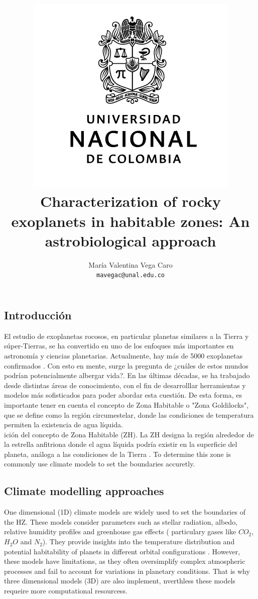 \documentclass{article}
\title{\vspace{-1.5cm}\includegraphics[scale=0.32]{Unal.jpg} \\ \vspace{-0.3cm} \textbf{Characterization of rocky exoplanets in habitable zones: An astrobiological approach}} %
\author{
    María Valentina Vega Caro\\
    
    \texttt{\textup{mavegac@unal.edu.co}}
    }
\affil{
    \textbf{Trabajo de Grado} \\
    \textbf{Universidad Nacional de Colombia} \\ 
    Bogotá D.C., Colombia
    }
\begin{document}
\renewcommand{\listtablename}{Índice de Tablas}
\renewcommand{\tablename}{Tabla}
\sloppy
\maketitle


\noindent\makebox[\linewidth]{\rule{18cm}{0.4pt}}

\vspace{0.3cm}

\begin{abstract} %
    
\end{abstract}
\noindent\makebox[\linewidth]{\rule{18cm}{0.4pt}}

\vspace{0.3cm}
\begin{multicols}{2}
    

\section{Introducción} %
    El estudio de exoplanetas rocosos, en particular planetas similares a la Tierra y súper-Tierras, se ha convertido en uno de los enfoques más importantes en astronomía y ciencias planetarias. Actualmente, hay más de 5000 exoplanetas confirmados \cite{caltechNASAExoplanet}. Con esto en mente, surge la pregunta de ¿cuáles de estos mundos podrían potencialmente albergar vida?. En las últimas décadas, se ha trabajado desde distintas áreas de conocimiento, con el fin de desarrolllar herramientas y modelos más sofisticados para poder abordar esta cuestión. De esta forma, es importante tener en cuenta el concepto de Zona Habitable o "Zona Goldilocks", que se define como la región circumestelar, donde las condiciones de temperatura permiten la existencia de agua líquida.\\
    ición del concepto de Zona Habitable (ZH). La ZH designa la región alrededor de la estrella anfitriona donde el agua líquida podría existir en la superficie del planeta, análoga a las condiciones de la Tierra \cite{kasting1993}. To determine this zone is commonly use climate models to set the boundaries accuretly. \\
    \subsection{\textbf{Climate modelling approaches}}
    One dimensional (1D) climate models are widely used to set the boundaries of the HZ. These models consider parameters such as stellar radiation, albedo, relative humidity profiles and greenhouse gas effects ( particulary gases like $CO_{2}$, $H_{2}O$ and $N_{2}$). They provide insights into the temperature distribution and potential habitability of planets in different orbital configurations \cite{kopparapu2019}. However, these models have limitations, as they often oversimplify complex atmospheric processes and fail to account for variations in planetary conditions. That is why three dimensional models (3D) are also implement, nverthless these models requeire more computational resourcess.\\

\end{multicols}
\end{document}
